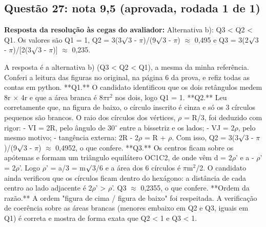 \documentclass{article}%
\begin{document}
\subsection*{Questão 27: nota 9,5 (aprovada, rodada 1 de 1)}%
\textbf{Resposta da resolução às cegas do avaliador:} Alternativa b): Q3 < Q2 < Q1. Os valores são Q1 = 1, Q2 = 3(3$\surd$3 - $\pi$)/(9$\surd$3 - $\pi$) $\approx$ 0,495 e Q3 = 3(2$\surd$3 - $\pi$)/{[}2(3$\surd$3 - $\pi$){]} $\approx$ 0,235.\par %
A resposta é a alternativa b) (Q3 < Q2 < Q1), a mesma da minha referência. Conferi a leitura das figuras no original, na página 6 da prova, e refiz todas as contas em python.\newline%
\newline%
**Q1.** O candidato identificou que os dois retângulos medem 8r $\times$ 4r e que a área branca é 8$\pi$r$^2$ nos dois, logo Q1 = 1.\newline%
\newline%
**Q2.** Leu corretamente que, na figura de baixo, o círculo inscrito é cinza e só os 3 círculos pequenos são brancos. O raio dos círculos dos vértices, $\rho$ = R/3, foi deduzido com rigor:\newline%
{-} VI = 2R, pelo ângulo de 30$^\circ$ entre a bissetriz e os lados;\newline%
{-} VJ = 2$\rho$, pelo mesmo motivo;\newline%
{-} tangência externa: 2R - 2$\rho$ = R + $\rho$.\newline%
\newline%
Com isso, Q2 = 3(3$\surd$3 - $\pi$)/(9$\surd$3 - $\pi$) $\approx$ 0,4952, o que confere.\newline%
\newline%
**Q3.** Os centros ficam sobre os apótemas e formam um triângulo equilátero OC1C2, de onde vêm d = 2$\rho$' e a - $\rho$' = 2$\rho$'. Logo $\rho$' = a/3 = m$\surd$3/6 e a área dos 6 círculos é $\pi$m$^2$/2. O candidato ainda verificou que os círculos ficam dentro do hexágono: a distância de cada centro ao lado adjacente é 2$\rho$' > $\rho$'. Q3 $\approx$ 0,2355, o que confere.\newline%
\newline%
**Ordem da razão.** A ordem "figura de cima / figura de baixo" foi respeitada. A verificação de coerência sobre as áreas brancas (menores embaixo em Q2 e Q3, iguais em Q1) é correta e mostra de forma exata que Q2 < 1 e Q3 < 1.\newline%
\newline%
\end{document}
